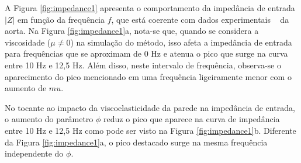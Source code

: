 \documentclass[a4paper,12pt]{monografia}
\theoremstyle{plain}
\theoremstyle{definition}
\theoremstyle{remark}
\begin{document}
A Figura \ref{fig:impedance1} apresenta o comportamento da impedância de entrada $|Z|$ em função da frequência $f$, que está coerente com dados experimentais ~\cite{Nichols2011} da aorta. Na Figura \ref{fig:impedance1}a, nota-se que, quando se considera a viscosidade ($\mu \neq 0$) na simulação do método, isso afeta a impedância de entrada para frequências que se aproximam de 0 Hz e atenua o pico que surge na curva entre 10 Hz e 12,5 Hz. Além disso, neste intervalo de frequência, observa-se o aparecimento do pico mencionado em uma frequência ligeiramente menor com o aumento de $mu$.

No tocante ao impacto da viscoelasticidade da parede na impedância de entrada, o aumento do parâmetro $\phi$ reduz o pico que aparece na curva de impedância entre 10 Hz e 12,5 Hz como pode ser visto na Figura \ref{fig:impedance1}b. Diferente da Figura \ref{fig:impedance1}a, o pico destacado surge na mesma frequência independente do $\phi$.
\end{document}
